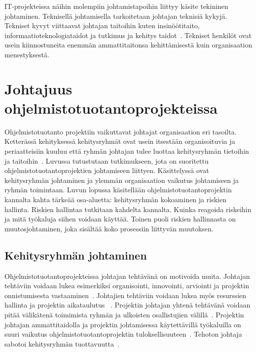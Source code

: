 \documentclass[finnish]{tktltiki2}
\theoremstyle{definition}
\theoremstyle{remark}
\begin{document}
IT-projekteissa näihin molempiin johtamistapoihin liittyy käsite tekininen johtaminen. Teknisellä johtamisella tarkoitetaan johtajan teknisiä kykyjä. Tekniset kyvyt viittaavat johtajan taitoihin kuten insinöötitaito, informaatioteknologiataidot ja tutkimus ja kehitys taidot~\cite{thite2000leadership}. Tekniset henkilöt ovat usein kiinnostuneita enemmän ammattitaitonsa kehittämisestä kuin organisaation menestyksestä. 
   



  


\section{Johtajuus ohjelmistotuotantoprojekteissa}

Ohjelmistotuotanto projektiin vaikuttavat johtajat organisaation eri tasoilta. Ketterässä kehityksessä kehitysryhmät ovat usein itsestään organisoituvia ja periaatteisiin kuuluu että ryhmän johtajan tulee luottaa kehitysryhmän tietoihin ja taitoihin~\cite{fowler2001agile}. Luvussa tutustutaan tutkimukseen, jota on suoritettu ohjelmistotuotantoprojektien johtamiseen liittyen. Käsittelyssä ovat kehitysryhmän johtaminen ja ylemmän organisaation vaikutus johtamiseen ja ryhmän toimintaan. Luvun lopussa käsitellään ohjelmistotuotantoprojektin kannalta kahta tärkeää osa-aluetta: kehitysryhmän kokoaminen ja riskien hallinta. Riskien hallintaa tutkitaan kahdelta kannalta. Kuinka reagoida riskeihin ja mitä työkaluja siihen voidaan käyttää. Toinen puoli riskien hallinnasta on muutosjohtaminen, joka sisältää koko prosessiin liittyvän muutoksen.

\subsection{Kehitysryhmän johtaminen}

Ohjelmistotuotantoprojekteissa johtajan tehtävänä on motivoida muita. Johtajan tehtäviin voidaan lukea esimerkiksi organisointi, innovointi, arviointi ja projektin onnistumisesta vastaaminen~\cite{4017705}. Johtajien tehtäviin voidaan lukea myös resurssien hallinta ja projektin aikataulutus ~\cite{Dhomne:2012:ITL:2382887.2382899}. Projektin johtajan yhtenä tehtävänä voidaan pitää välikätenä toimimista ryhmän ja ulkoisten osallistujien välillä~\cite{McLeod:2011:FAS:1978802.1978803}. Projektin johtajan ammattitaidolla ja projektin johtamisessa käytettävillä työkaluilla on suuri vaikutus ohjelmistotuotantoprojektin tuloksellisuuteen~\cite{McLeod:2011:FAS:1978802.1978803}. Tehoton johtaja sabotoi kehitysryhmän tuottavuutta~\cite{bradley1997effect}.
\end{document}
